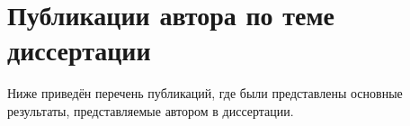 






\section*{\LARGE Публикации автора по теме диссертации}

Ниже приведён перечень публикаций, где были представлены основные результаты, представляемые автором в диссертации. \\

\renewcommand{\bibsection}{\noindent \textbf{\refname}}

